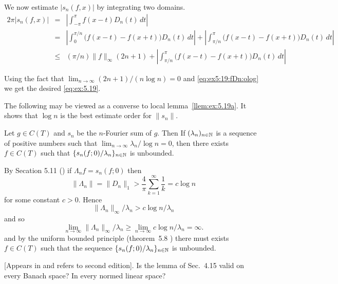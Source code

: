 \begin{enumerate}
\begin{thmproof}
We now estimate \(|s_n(f,x)|\) by integrating two domains.
\begin{eqnarray*}
2\pi |s_n(f,x)|
&=& \left| \int_{-\pi}^{\pi} f(x-t)D_n(t)\,dt \right| \\
&=& 
     \left|\int_0^{\pi/n} \bigl(f(x-t) - f(x+t)\bigr)D_n(t)\,dt\right| 
   + 
     \left|\int_{\pi/n}^{\pi} \bigl(f(x-t) - f(x+t)\bigr)D_n(t)\,dt\right| \\
&\leq&
     (\pi/n) \|f\|_\infty (2n+1)
   + \left|\int_{\pi/n}^{\pi} \bigl(f(x-t) - f(x+t)\bigr)D_n(t)\,dt\right| 
\end{eqnarray*}

Using the fact that \(\lim_{n\to\infty} (2n+1) / (n\log n) = 0\)
and \eqref{eq:ex5:19:fDn:olog} we get the desired \eqref{eq:ex:5.19}.
\end{thmproof}

The following may be viewed as a converse to local lemma~\ref{llem:ex:5.19a}.
It shows that \(\log n\) is the best estimate order for \(\|s_n\|\).
\begin{llem} 
Let \(g\in C(T)\) and \(s_n\) be the $n$-Fourier sum of $g$.
Then 
If \((\lambda_n)_{n\in\mathbb{N}}\) is a sequence of positive numbers
such that \(\lim_{n\to\infty}\lambda_n/\log n = 0\),
then there exists \(f\in C(T)\) such that
\(\{s_n(f;0)/\lambda_n\}_{n\in\mathbb{N}}\) is unbounded.
\end{llem}

\begin{thmproof}
By Secation 5.11 (\cite{RudinRCA87}) if \(\Lambda_n f = s_n(f;0)\)
then
\begin{equation*}
\| \Lambda_n\| = \|D_n\|_1 
 > \frac{4}{\pi}\sum_{k=1}^\infty \frac{1}{k} = c \log n
\end{equation*}
for some constant \(c>0\).
Hence
\begin{equation*}
\|\Lambda_n\|_\infty /\lambda_n > c \log n / \lambda_n
\end{equation*}
and so 
\begin{equation*}
\lim_{n\to\infty} \|\Lambda_n\|_\infty /\lambda_n 
\geq \lim_{n\to\infty} c \log n / \lambda_n = \infty.
\end{equation*}
and by the uniform bounded principle (theorem~5.8 \cite{RudinRCA87})
there must exists \(f\in C(T)\) such that the sequence
\(\{s_n(f;0)/\lambda_n\}_{n\in\mathbb{N}}\) is unbounded.
\end{thmproof}


\begin{excopy}
{\small [Appears in and refers to second edition].}\newline
Is the lemma of Sec.~4.15 valid on every Banach space?
In every normed linear space?
\end{excopy}


\end{enumerate}
